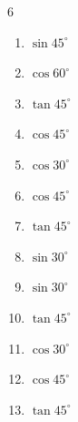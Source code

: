 \begin{multicols}{6}
\begin{enumerate}
  \item $\displaystyle \sin{45^\circ}$


  \item $\displaystyle \cos{60^\circ}$


  \item $\displaystyle \tan{45^\circ}$

        \phantom{$\displaystyle =1$}

  \item $\displaystyle \cos{45^\circ}$


  \item $\displaystyle \cos{30^\circ}$


  \item $\displaystyle \cos{45^\circ}$


  \item $\displaystyle \tan{45^\circ}$

        \phantom{$\displaystyle =1$}

  \item $\displaystyle \sin{30^\circ}$


  \item $\displaystyle \sin{30^\circ}$


  \item $\displaystyle \tan{45^\circ}$

        \phantom{$\displaystyle =1$}

  \item $\displaystyle \cos{30^\circ}$


\columnbreak %

  \item $\displaystyle \cos{45^\circ}$


  \item $\displaystyle \tan{45^\circ}$


\end{enumerate}
\end{multicols}
